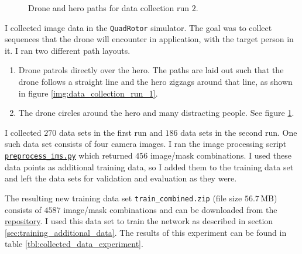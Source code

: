 \documentclass[11pt, onecolumn, oneside, reqno]{article}
\begin{document}
\begin{figure}
\noindent
{}
\caption[Paths for data collection run $2$]{Drone and hero paths for data collection run $2$.}
\label{img:data_collection_run_2}
\end{figure}
I collected image data in the \texttt{QuadRotor} simulator. The goal was to collect sequences that the drone will encounter in application, with the target person in it. I ran two different path layouts.
\begin{enumerate}
\item Drone patrols directly over the hero. The paths are laid out such that the drone follows a straight line and the hero zigzags around that line, as shown in figure \ref{img:data_collection_run_1}.
\item The drone circles around the hero and many distracting people. See figure \ref{img:data_collection_run_2}.
\end{enumerate}

I collected $270$ data sets in the first run and $186$ data sets in the second run. One such data set consists of four camera images. I ran the image processing script \href{https://github.com/S2H-Mobile/RoboND-DeepLearning-Project-Solution/blob/master/code/preprocess_ims.py}{\texttt{preprocess\_ims.py}} which returned $456$ image/mask combinations. I used these data points as additional training data, so I added them to the training data set and left the data sets for validation and evaluation as they were.

The resulting new training data set \texttt{train\_combined.zip} (file size $56.7$\,MB) consists of $4587$ image/mask combinations and can be downloaded from the \href{https://github.com/S2H-Mobile/RoboND-DeepLearning-Project-Solution/tree/master/data}{repository}. I used this data set to train the network as described in section \ref{sec:training_additional_data}. The results of this experiment can be found in table \ref{tbl:collected_data_experiment}.
\end{document}
